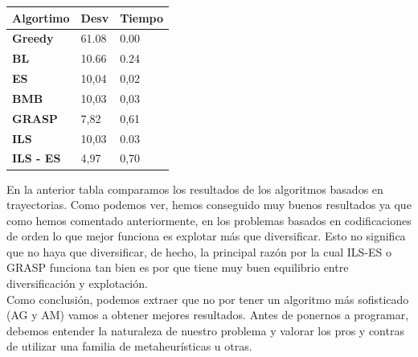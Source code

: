 \documentclass[a4paper, 12pt]{article}
\begin{document}
      \newpage
      \begin{table}[H]
\centering
\begin{tabular}{|l|l|l|}
\hline
\multicolumn{1}{|c|}{\textbf{Algortimo}} & \multicolumn{1}{c|}{\textbf{Desv}} & \multicolumn{1}{c|}{\textbf{Tiempo}} \\ \hline
\textbf{Greedy}                          & 61.08                              & 0.00                                 \\ \hline
\textbf{BL}                              & 10.66                              & 0.24                                 \\ \hline
\textbf{ES}                              & 10,04                              & 0,02                                 \\ \hline
\textbf{BMB}                             & 10,03                              & 0,03                                 \\ \hline
\textbf{GRASP}                           & 7,82                               & 0,61                                 \\ \hline
\textbf{ILS}                             & 10,03                              & 0.03                                 \\ \hline
\textbf{ILS - ES}                        & 4,97                               & 0,70                                 \\ \hline
\end{tabular}
\end{table}
      
      En la anterior tabla comparamos los resultados de los algoritmos basados en trayectorias. Como podemos ver, hemos conseguido muy buenos resultados ya que como hemos comentado anteriormente, en los problemas basados en codificaciones de orden lo que mejor funciona es explotar más que diversificar. Esto no significa que no haya que diversificar, de hecho, la principal razón por la cual ILS-ES o GRASP funciona tan bien es por que tiene muy buen equilibrio entre diversificación y explotación.\\
      
      Como conclusión, podemos extraer que no por tener un algoritmo más sofisticado (AG y AM) vamos a obtener mejores resultados. Antes de ponernos a programar, debemos entender la naturaleza de nuestro problema y valorar los pros y contras de utilizar una familia de metaheurísticas u otras. 	
   
\printindex
\end{document}
